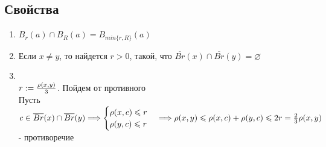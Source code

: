 \documentclass[12pt,letterpaper]{report}
\makeatletter
\theoremstyle{definition}
\renewenvironment{proof}[1][\proofname]{%
   \par\pushQED{\qed}\normalfont%
   \topsep6\p@\@plus6\p@\relax
   \trivlist\item[\hskip\labelsep\bfseries#1\@addpunct{.}]%
   \ignorespaces
}{%
   \popQED\endtrivlist\@endpefalse
}
\makeatother
\begin{document}
    \subsection*{Свойства}
    \begin{enumerate}
        \item $B_r(a) \cap B_R(a) = B_{min\{r, R\}}(a)$
        \item Если $x \neq y$, то найдется $r > 0$, такой, что 
        $\overline{Br}(x) \cap \overline{Br}(y) = \varnothing$
        \begin{proof}
            \quad \\
            $r := {{\rho(x, y)}\over{3}}$. Пойдем от противного \\
            Пусть $c \in \overline{Br}(x) \cap \overline{Br}(y) \Longrightarrow
            \begin{cases}
                \rho(x, c) \leqslant r \\
                \rho(y, c) \leqslant r
            \end{cases} \Longrightarrow \rho(x, y) \leqslant \rho(x, c) + \rho(y, c) 
            \leqslant 2r = {{2}\over{3}}\rho(x, y)$ - противоречие
        \end{proof}
    \end{enumerate}
\end{document}
